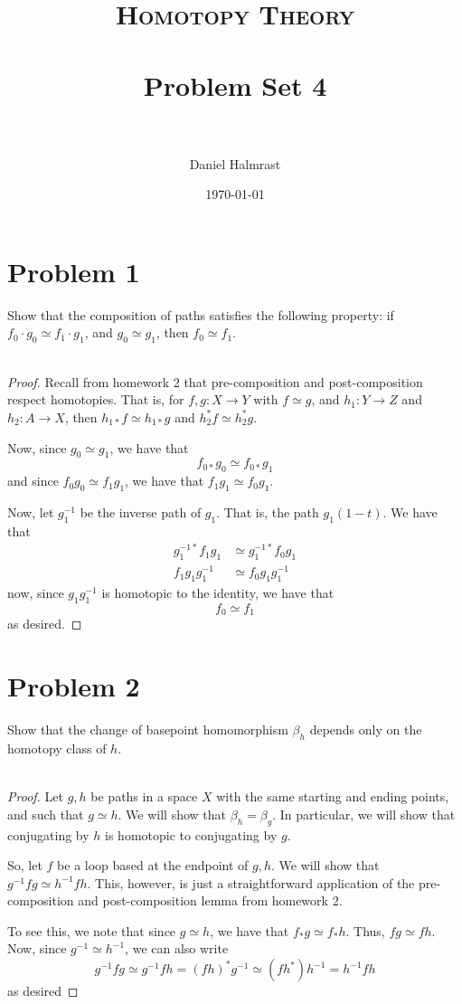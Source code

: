 \documentclass[fontsize=11pt]{scrartcl} %
\title{	
\normalfont \normalsize 
\textsc{Homotopy Theory} \\ [25pt] %
\horrule{0.5pt} \\[0.4cm] %
\huge Problem Set 4 \\ %
\horrule{2pt} \\[0.5cm] %
}
\author{Daniel Halmrast} %
\date{\normalsize\today} %
\numberwithin{equation}{section} %
\numberwithin{figure}{section} %
\numberwithin{table}{section} %
\begin{document}
\maketitle %

\section*{Problem 1}
Show that the composition of paths satisfies the following property: if 
$f_0\cdot g_0 \simeq f_1\cdot g_1$, and $g_0\simeq g_1$, then $f_0\simeq f_1$.
\\
\\
\begin{proof}
    Recall from homework 2 that pre-composition and post-composition respect
    homotopies. That is, for $f,g:X\to Y$ with $f\simeq g$, and $h_1:Y\to Z$ and
    $h_2:A\to X$, then $h_{1*}f\simeq h_{1*}g$ and $h_2^*f\simeq h_2^*g$.

    Now, since $g_0\simeq g_1$, we have that
    \[
        f_{0*}g_0\simeq f_{0*}g_1
    \]
    and since $f_0g_0\simeq f_1g_1$, we have that $f_1g_1\simeq f_0g_1$.

    Now, let $g_1^{-1}$ be the inverse path of $g_1$. That is, the path
    $g_1(1-t)$. We have that 
    \[
        \begin{aligned}
            g_1^{-1*}f_1g_1 &\simeq g_1^{-1*}f_0g_1\\
            f_1g_1g_1^{-1} &\simeq f_0g_1g_1^{-1}
        \end{aligned}
    \]
    now, since $g_1g_1^{-1}$ is homotopic to the identity, we have that
    \[
        f_0\simeq f_1
    \]
    as desired.
\end{proof}


\section*{Problem 2}
Show that the change of basepoint homomorphism $\beta_h$ depends only on the
homotopy class of $h$.
\\
\\
\begin{proof}
    Let $g,h$ be paths in a space $X$ with the same starting and ending points,
    and such that $g\simeq h$. We will show that $\beta_h=\beta_g$. In
    particular, we will show that conjugating by $h$ is homotopic to conjugating
    by $g$.

    So, let $f$ be a loop based at the endpoint of $g,h$. We will show that
    $g^{-1}fg \simeq h^{-1}fh$. This, however, is just a straightforward
    application of the pre-composition and post-composition lemma from homework
    2.
    
    To see this, we note that since $g\simeq h$, we have that $f_*g\simeq f_*h$.
    Thus, $fg\simeq fh$. Now, since $g^{-1}\simeq h^{-1}$, we can also write
    \[
        g^{-1}fg\simeq g^{-1}fh = (fh)^*g^{-1}\simeq (fh^*)h^{-1} = h^{-1}fh
    \]
    as desired
\end{proof}
\end{document}
